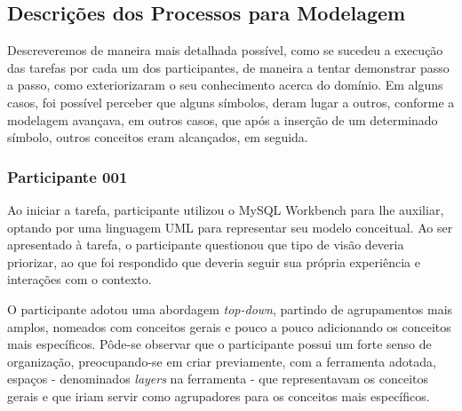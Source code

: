 \subsection{\hspace*{3pt} Descrições dos Processos para Modelagem}
\label{sec:descricoes_modelos}

Descreveremos de maneira mais detalhada possível, como se sucedeu a execução das tarefas por cada um dos participantes, de maneira a tentar demonstrar passo a passo, como exteriorizaram o seu conhecimento acerca do domínio. Em alguns casos, foi possível perceber que alguns símbolos, deram lugar a outros, conforme a modelagem avançava, em outros casos, que após a inserção de um determinado símbolo, outros conceitos eram alcançados, em seguida.

\subsubsection{\hspace*{3pt} Participante 001}
\label{sec:participante_001}

Ao iniciar a tarefa, participante utilizou o MySQL Workbench para lhe auxiliar, optando por uma linguagem UML para representar seu modelo conceitual. Ao ser apresentado à tarefa, o participante questionou que tipo de visão deveria priorizar, ao que foi respondido que deveria seguir sua própria experiência e interações com o contexto.

O participante adotou uma abordagem \textit{top-down}, partindo de agrupamentos mais amplos, nomeados com conceitos gerais e pouco a pouco adicionando os conceitos mais específicos. Pôde-se observar que o participante possui um forte senso de organização, preocupando-se em criar previamente, com a ferramenta adotada, espaços - denominados \textit{layers} na ferramenta - que representavam os conceitos gerais e que iriam servir como agrupadores para os conceitos mais específicos. 

